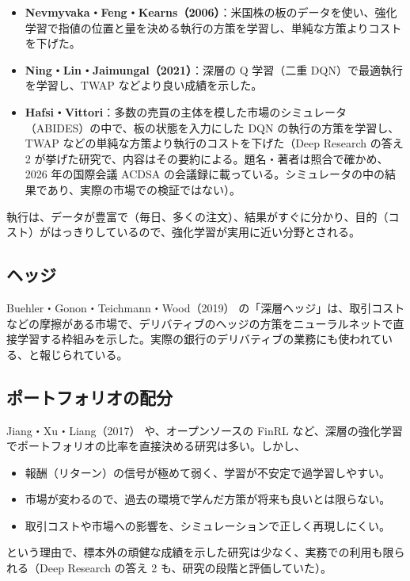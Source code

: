 \begin{itemize}
\item \textbf{Nevmyvaka・Feng・Kearns（2006）}\cite{nfk2006}：米国株の板のデータを使い、強化学習で指値の位置と量を決める執行の方策を学習し、単純な方策よりコストを下げた。
\item \textbf{Ning・Lin・Jaimungal（2021）}\cite{nlj2021}：深層の Q 学習（二重 DQN）で最適執行を学習し、TWAP などより良い成績を示した。
\item \textbf{Hafsi・Vittori}\cite{hafsivittori}：多数の売買の主体を模した市場のシミュレータ（ABIDES）の中で、板の状態を入力にした DQN の執行の方策を学習し、TWAP などの単純な方策より執行のコストを下げた（Deep Research の答え 2 が挙げた研究で、内容はその要約による。題名・著者は照合で確かめ、2026 年の国際会議 ACDSA の会議録に載っている。シミュレータの中の結果であり、実際の市場での検証ではない）。
\end{itemize}

執行は、データが豊富で（毎日、多くの注文）、結果がすぐに分かり、目的（コスト）がはっきりしているので、強化学習が実用に近い分野とされる。

\subsection{ヘッジ}

Buehler・Gonon・Teichmann・Wood（2019）\cite{deephedging2019} の「深層ヘッジ」は、取引コストなどの摩擦がある市場で、デリバティブのヘッジの方策をニューラルネットで直接学習する枠組みを示した。実際の銀行のデリバティブの業務にも使われている、と報じられている。

\subsection{ポートフォリオの配分}

Jiang・Xu・Liang（2017）\cite{jxl2017} や、オープンソースの FinRL \cite{finrl2020} など、深層の強化学習でポートフォリオの比率を直接決める研究は多い。しかし、

\begin{itemize}
\item 報酬（リターン）の信号が極めて弱く、学習が不安定で過学習しやすい。
\item 市場が変わるので、過去の環境で学んだ方策が将来も良いとは限らない。
\item 取引コストや市場への影響を、シミュレーションで正しく再現しにくい。
\end{itemize}
という理由で、標本外の頑健な成績を示した研究は少なく、実務での利用も限られる（Deep Research の答え 2 も、研究の段階と評価していた）。

